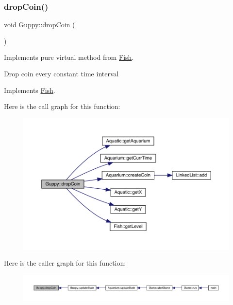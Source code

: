 \subsubsection{\texorpdfstring{drop\+Coin()}{dropCoin()}}
{\footnotesize\ttfamily void Guppy\+::drop\+Coin (\begin{DoxyParamCaption}{ }\end{DoxyParamCaption})\hspace{0.3cm}{\ttfamily [virtual]}}



Implements pure virtual method from \mbox{\hyperlink{class_fish}{Fish}}. 

Drop coin every constant time interval 

Implements \mbox{\hyperlink{class_fish_a899c7712639756297b9205e8bbcc2cf6}{Fish}}.

Here is the call graph for this function\+:\nopagebreak
\begin{figure}[H]
\begin{center}
\leavevmode
\includegraphics[width=350pt]{class_guppy_a356d1f45f52684bba3e6e9e7774e59b8_cgraph}
\end{center}
\end{figure}
Here is the caller graph for this function\+:\nopagebreak
\begin{figure}[H]
\begin{center}
\leavevmode
\includegraphics[width=350pt]{class_guppy_a356d1f45f52684bba3e6e9e7774e59b8_icgraph}
\end{center}
\end{figure}
\mbox{\label{class_guppy_afe934262a0988e4ad041f4ed3a1a7e02}} 
